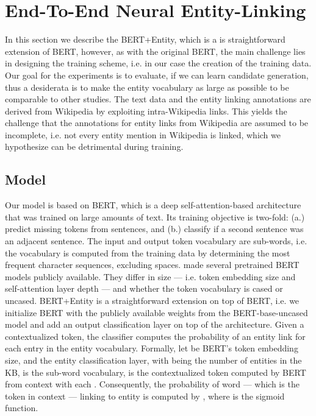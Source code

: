 \documentclass[11pt,a4paper]{article}
\begin{document}
\section{End-To-End Neural Entity-Linking}

In this section we describe the BERT+Entity, which is a is straightforward extension of BERT, however, as with the original BERT, the main challenge lies in designing the training scheme, i.e. in our case the creation of the training data. 
Our goal for the experiments is to evaluate, if we can learn candidate generation, thus a desiderata is to make the entity vocabulary as large as possible to be comparable to other studies. The text data and the entity linking annotations are derived from Wikipedia by exploiting intra-Wikipedia links. This yields the challenge that the annotations for entity links from Wikipedia are assumed to be incomplete, i.e. not every entity mention in Wikipedia is linked, which we hypothesize can be detrimental during training.  

\subsection{Model}
Our model is based on BERT, which is a deep self-attention-based architecture \cite{DBLP:conf/nips/VaswaniSPUJGKP17/AttentionTransformer} that was trained on large amounts of text. Its training objective is two-fold: (a.) predict missing tokens from sentences, and (b.) classify if a second sentence was an adjacent sentence. The input and output token vocabulary are sub-words, i.e. the vocabulary is computed from the training data by determining the   most frequent character sequences, excluding spaces. \citet{DBLP:conf/naacl/DevlinCLT19} made several pretrained BERT models publicly available. They differ in size --- i.e. token embedding size and self-attention layer depth --- and whether the token vocabulary is cased or uncased. BERT+Entity is a straightforward extension on top of BERT, i.e. we initialize BERT with the publicly available weights from the BERT-base-uncased model and add an output classification layer on top of the architecture. Given a contextualized token, the classifier computes the probability of an entity link for each entry in the entity vocabulary. Formally, let  be BERT's token embedding size, and  the entity classification layer, with  being the number of entities in the KB,  is the sub-word vocabulary,  is the  contextualized token computed by BERT from context  with each . Consequently, the probability  of word  --- which is the  token in context  --- linking to entity  is computed by , where  is the sigmoid function.
\end{document}
